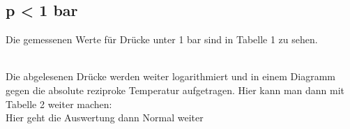 \subsection{p < 1 bar}
Die gemessenen Werte für Drücke unter 1 bar sind in Tabelle 1 zu sehen.

\\
Die abgelesenen Drücke werden weiter logarithmiert und in einem Diagramm gegen
die absolute reziproke Temperatur aufgetragen.
\newpage
Hier kann man dann mit Tabelle 2 weiter machen:
 \\
Hier geht die Auswertung dann Normal weiter
